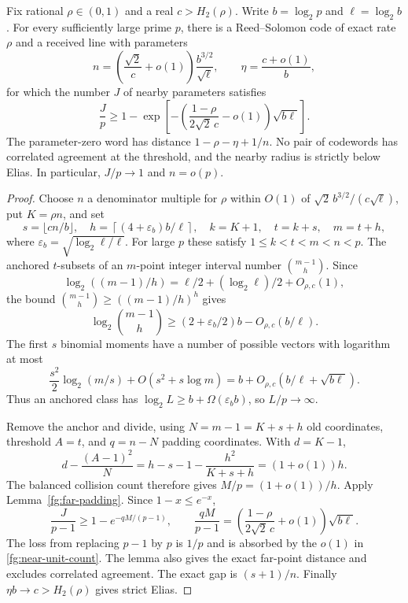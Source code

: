 \begin{theorem}\label{fg:near-unit-density}
Fix rational $\rho\in(0,1)$ and a real $c>H_2(\rho)$. Write
$b=\log_2p$ and $\ell=\log_2b$. For every sufficiently large prime $p$,
there is a Reed--Solomon code of exact rate $\rho$ and a received line
with parameters
\[
 n=\left(\frac{\sqrt2}{c}+o(1)\right)\frac{b^{3/2}}{\sqrt\ell},
 \qquad \eta=\frac{c+o(1)}b,
\]
for which the number $J$ of nearby parameters satisfies
\begin{equation}\label{fg:near-unit-count}
 \frac Jp\ge1-\exp\!\left[-\left(\frac{1-\rho}{2\sqrt2\,c}-o(1)\right)
 \sqrt{b\ell}\right].
\end{equation}
The parameter-zero word has distance $1-\rho-\eta+1/n$.
No pair of codewords has correlated agreement at the threshold, and
the nearby radius is strictly below Elias. In particular, $J/p\to1$ and
$n=o(p)$.
\end{theorem}
\begin{proof}
Choose $n$ a denominator multiple for $\rho$ within $O(1)$ of
$\sqrt2\,b^{3/2}/(c\sqrt\ell)$, put $K=\rho n$, and set
\[
 s=\lfloor cn/b\rfloor,\quad
 h=\left\lceil(4+\varepsilon_b)b/\ell\right\rceil,\quad
 k=K+1,\quad t=k+s,\quad m=t+h,
\]
where $\varepsilon_b=\sqrt{\log_2\ell/\ell}$. For large $p$ these
satisfy $1\le k<t<m<n<p$. The anchored $t$-subsets of an $m$-point
integer interval number $\binom{m-1}h$. Since
\[
 \log_2((m-1)/h)=\ell/2+(\log_2\ell)/2+O_{\rho,c}(1),
\]
the bound $\binom{m-1}h\ge((m-1)/h)^h$ gives
\[
 \log_2\binom{m-1}h\ge(2+\varepsilon_b/2)b-O_{\rho,c}(b/\ell).
\]
The first $s$ binomial moments have a number of possible vectors with
logarithm at most
\[
 \frac{s^2}{2}\log_2(m/s)+O(s^2+s\log m)
 =b+O_{\rho,c}(b/\ell+\sqrt{b\ell}).
\]
Thus an anchored class has $\log_2L\ge b+\Omega(\varepsilon_b b)$,
so $L/p\to\infty$.

Remove the anchor and divide, using $N=m-1=K+s+h$ old coordinates,
threshold $A=t$, and $q=n-N$ padding coordinates. With $d=K-1$,
\[
 d-\frac{(A-1)^2}{N}
 =h-s-1-\frac{h^2}{K+s+h}=(1+o(1))h.
\]
The balanced collision count therefore gives $M/p=(1+o(1))/h$.
Apply Lemma~\ref{fg:far-padding}. Since $1-x\le e^{-x}$,
\[
 \frac{J}{p-1}\ge1-e^{-qM/(p-1)},\qquad
 \frac{qM}{p-1}=\left(\frac{1-\rho}{2\sqrt2\,c}+o(1)\right)\sqrt{b\ell}.
\]
The loss from replacing $p-1$ by $p$ is $1/p$ and is absorbed by the
$o(1)$ in \eqref{fg:near-unit-count}. The lemma also gives the exact
far-point distance and excludes correlated agreement.
The exact gap is $(s+1)/n$.
Finally $\eta b\to c>H_2(\rho)$ gives strict Elias.
\end{proof}

